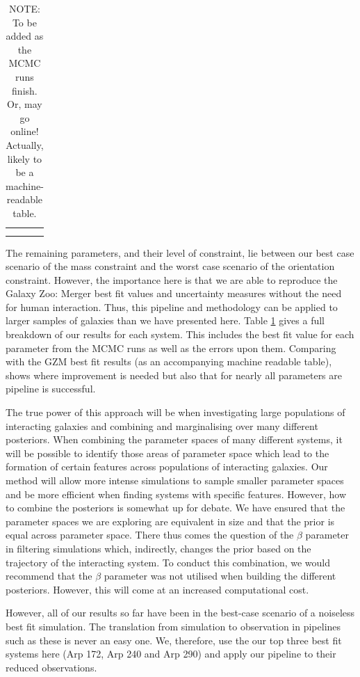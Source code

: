 \begin{table}[]
    \centering
    \begin{tabular}{c|c}
         &  \\
         & 
    \end{tabular}
    \caption{NOTE: To be added as the MCMC runs finish. Or, may go online! Actually, likely to be a machine-readable table.}
    \label{tab:constraints}
\end{table}

The remaining parameters, and their level of constraint, lie between our best case scenario of the mass constraint and the worst case scenario of the orientation constraint. However, the importance here is that we are able to reproduce the Galaxy Zoo: Merger best fit values and uncertainty measures without the need for human interaction. Thus, this pipeline and methodology can be applied to larger samples of galaxies than we have presented here. Table \ref{tab:constraints} gives a full breakdown of our results for each system. This includes the best fit value for each parameter from the MCMC runs as well as the errors upon them. Comparing with the GZM best fit results (as an accompanying machine readable table), shows where improvement is needed but also that for nearly all parameters are pipeline is successful. 

The true power of this approach will be when investigating large populations of interacting galaxies and combining and marginalising over many different posteriors. When combining the parameter spaces of many different systems, it will be possible to identify those areas of parameter space which lead to the formation of certain features across populations of interacting galaxies. Our method will allow more intense simulations to sample smaller parameter spaces and be more efficient when finding systems with specific features. However, how to combine the posteriors is somewhat up for debate. We have ensured that the parameter spaces we are exploring are equivalent in size and that the prior is equal across parameter space. There thus comes the question of the $\beta$ parameter in filtering simulations which, indirectly, changes the prior based on the trajectory of the interacting system. To conduct this combination, we would recommend that the $\beta$ parameter was not utilised when building the different posteriors. However, this will come at an increased computational cost. 

However, all of our results so far have been in the best-case scenario of a noiseless best fit simulation. The translation from simulation to observation in pipelines such as these is never an easy one. We, therefore, use the our top three best fit systems here (Arp 172, Arp 240 and Arp 290) and apply our pipeline to their reduced observations.

